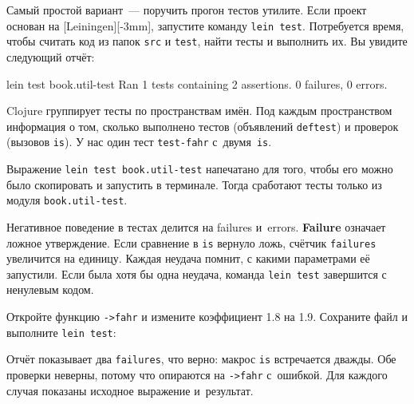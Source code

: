 
Самый простой вариант~--- поручить прогон тестов утилите. Если проект основан на
[Leiningen][-3mm], запустите команду \verb|lein test|.
Потребуется время, чтобы считать код из папок \verb|src| и \verb|test|,
найти тесты и выполнить их. Вы увидите следующий отчёт:

\begin{english}
  \begin{text}
lein test book.util-test
Ran 1 tests containing 2 assertions.
0 failures, 0 errors.
  \end{text}
\end{english}

Clojure группирует тесты по пространствам имён. Под каждым пространством
информация о том, сколько выполнено тестов (объявлений \verb|deftest|) и
проверок (вызовов \verb|is|). У нас один тест \verb|test-fahr| с~двумя~\verb|is|.


Выражение \verb|lein test book.util-test| напечатано для того, чтобы его можно
было скопировать и запустить в терминале. Тогда сработают тесты только из модуля
\verb|book.util-test|.

Негативное поведение в тестах делится на failures
и~errors. \textbf{Failure}  означает ложное утверждение. Если
сравнение в \verb|is| вернуло ложь, счётчик \verb|failures| увеличится на
единицу. Каждая неудача помнит, с какими параметрами её запустили. Если была
хотя бы одна неудача, команда \verb|lein test| завершится с ненулевым кодом.

Откройте функцию \verb|->fahr| и измените коэффициент 1.8 на 1.9. Сохраните
файл и выполните \verb|lein test|:

\begin{english}
\end{english}

Отчёт показывает два \verb|failures|, что верно: макрос \verb|is| встречается
дважды. Обе проверки неверны, потому что опираются на \verb|->fahr|
с~ошибкой. Для каждого случая показаны исходное выражение и~результат.

